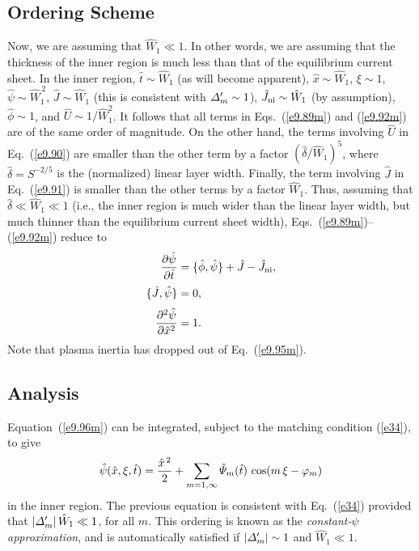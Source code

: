 \documentclass[12pt,prb,aps]{revtex4-1}
\begin{document}
\subsection{Ordering Scheme}
Now, we are assuming that $\hat{W}_1\ll 1$. In other words, we are assuming that the thickness of the
inner region is much less than that of the equilibrium current sheet. In the inner region,
$\hat{t}\sim \hat{W}_1$ (as will become apparent), $\hat{x}\sim \hat{W}_1$, $\xi\sim 1$, $\hat{\psi}\sim \hat{W}_1^{\,2}$, $\hat{J}\sim \hat{W}_1$ (this is
consistent with ${\mit\Delta}_m'\sim 1$), $\hat{J}_{\rm ni}\sim \hat{W}_1$ (by assumption), 
$\hat{\phi}\sim 1$, and $\hat{U}\sim 1/\hat{W}_1^2$.  It follows that all terms in Eqs.~(\ref{e9.89m}) and (\ref{e9.92m}) are of the same order of magnitude. On the other hand, the terms involving $\hat{U}$ in Eq.~(\ref{e9.90}) are 
smaller than the other term by a factor $(\hat{\delta}/\hat{W}_1)^5$, where $\hat{\delta}=S^{-2/5}$ is
the (normalized) linear layer width.\cite{fkr} Finally, the term involving $\hat{J}$ in Eq.~(\ref{e9.91})
is smaller than the other terms by a factor $\hat{W}_1$. Thus, assuming that $\hat{\delta}\ll \hat{W}_1\ll 1$ (i.e.,
the inner region is much wider than the linear layer width, but much thinner than the equilibrium current sheet width), Eqs.~(\ref{e9.89m})--(\ref{e9.92m})
reduce to 
\begin{align}
\frac{\partial\hat{\psi}}{\partial\hat{t}}&=\{\skew{3}\hat{\phi},\hat{\psi}\}+\hat{J}-\hat{J}_{\rm ni},\label{e9.94m}\\[0.5ex]
\{\hat{J},\hat{\psi}\}& = 0,\label{e9.95m}\\[0.5ex]
\frac{\partial^2\hat{\psi}}{\partial \hat{x}^2} &= 1\label{e9.96m}.
\end{align}
Note that plasma inertia has dropped out of Eq.~(\ref{e9.95m}). 

\subsection{Analysis}
Equation~(\ref{e9.96m}) can be integrated, subject to the matching condition (\ref{e34}), to give
\begin{equation}\label{e38}
\hat{\psi}(\hat{x},\xi,\hat{t}) = \frac{\hat{x}^{\,2}}{2} + \sum_{m=1,\infty}\hat{\mit \Psi}_m(\hat{t})\,\cos(m\,\xi-\varphi_m)
\end{equation}
in the inner region.
The previous equation is consistent with Eq.~(\ref{e34}) provided that $|{\mit\Delta}_m'|\,\hat{W}_1\ll 1$, for all $m$.  This ordering is
known as the {\em constant-$\psi$ approximation},\cite{fkr} and is automatically satisfied if $|{\mit\Delta}_m'|\sim 1$ and
$\hat{W}_1\ll 1$. 
\end{document}
